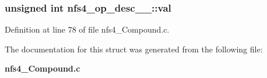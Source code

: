 \subsubsection[{val}]{\setlength{\rightskip}{0pt plus 5cm}unsigned int {\bf nfs4\_\-op\_\-desc\_\-\_\-::val}}\label{structnfs4__op__desc_____a168c7621645c370c859e5fe914df7ad7}


Definition at line 78 of file nfs4\_\-Compound.c.

The documentation for this struct was generated from the following file:\begin{DoxyCompactItemize}
\item 
{\bf nfs4\_\-Compound.c}\end{DoxyCompactItemize}
